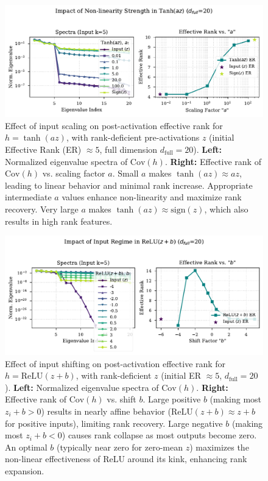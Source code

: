 \documentclass{article}
\begin{document}
\begin{figure}[ht!]
    \centering
    \includegraphics[width=0.7\linewidth]{theory_tanh_az_rank.pdf} 
    \caption{Effect of input scaling on post-activation effective rank for $h = \tanh(az)$, with rank-deficient pre-activations $z$ (initial Effective Rank (ER) $\approx 5$, full dimension $d_{\text{full}}=20$). \textbf{Left:} Normalized eigenvalue spectra of $\mathrm{Cov}(h)$. \textbf{Right:} Effective rank of $\mathrm{Cov}(h)$ vs. scaling factor $a$. Small $a$ makes $\tanh(az) \approx az$, leading to linear behavior and minimal rank increase. Appropriate intermediate $a$ values enhance non-linearity and maximize rank recovery. Very large $a$ makes $\tanh(az) \approx \mathrm{sign}(z)$, which also results in high rank features.}
    \label{fig:theory_tanh_az_rank}
\end{figure}

\begin{figure}[ht!]
    \centering
    \includegraphics[width=0.7\linewidth]{theory_relu_zb_rank.pdf} 
    \caption{Effect of input shifting on post-activation effective rank for $h = \mathrm{ReLU}(z+b)$, with rank-deficient $z$ (initial ER $\approx 5$, $d_{\text{full}}=20$). \textbf{Left:} Normalized eigenvalue spectra of $\mathrm{Cov}(h)$. \textbf{Right:} Effective rank of $\mathrm{Cov}(h)$ vs. shift $b$. Large positive $b$ (making most $z_i+b > 0$) results in nearly affine behavior ($\mathrm{ReLU}(z+b) \approx z+b$ for positive inputs), limiting rank recovery. Large negative $b$ (making most $z_i+b < 0$) causes rank collapse as most outputs become zero. An optimal $b$ (typically near zero for zero-mean $z$) maximizes the non-linear effectiveness of ReLU around its kink, enhancing rank expansion.}
    \label{fig:theory_relu_zb_rank}
\end{figure}
\end{document}
